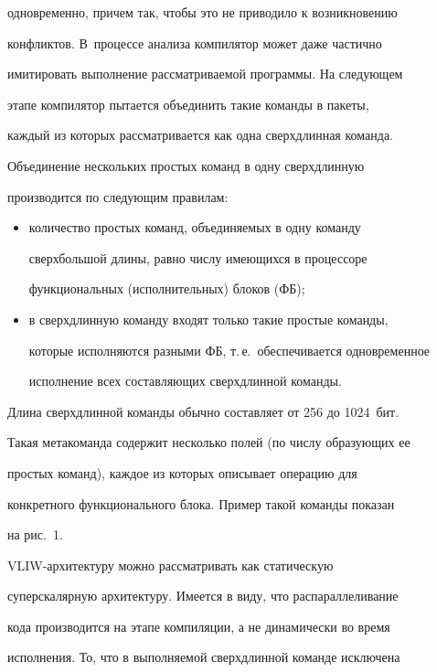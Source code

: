 одновременно, причем так, чтобы это не приводило к возникновению 


конфликтов. В~процессе анализа компилятор может даже час\-тич\-но 


имитировать выполнение рассматриваемой программы. На следующем 


этапе компилятор пытается объединить такие команды в пакеты, 


каждый из которых рассматривается как одна сверхдлинная команда. 


Объединение нескольких простых команд в одну сверхдлинную 


производится по следующим правилам:


 \begin{itemize}


\item  количество простых команд, объединяемых в одну команду  


сверхбольшой длины, равно числу имеющихся в процессоре 


функциональных (исполнительных) блоков (ФБ);


\item в сверхдлинную команду входят только такие простые команды, 


которые исполняются разными ФБ, т.\,е.\ обеспечивается одновременное 


исполнение всех составляющих сверхдлинной команды.


\end{itemize}





Длина сверхдлинной команды обычно составляет от 256 до 1024~бит. 


Такая метакоманда содержит несколько полей (по числу образующих ее 


простых команд), каждое из которых описывает операцию для 


конкретного функционального блока. Пример такой команды показан 


на рис.~1.





VLIW-архитектуру можно рассматривать как статическую 


суперскалярную архитектуру. Имеется в виду, что распараллеливание 


кода производится на этапе компиляции, а не динамически во время 


исполнения. То, что в выполняемой сверхдлинной команде исключена 


